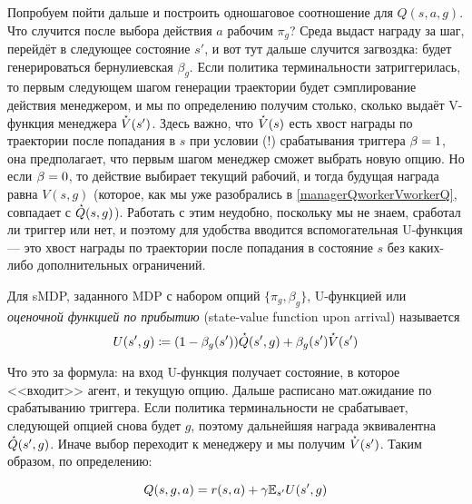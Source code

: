 Попробуем пойти дальше и построить одношаговое соотношение для $Q(s, a, g)$. Что случится после выбора действия $a$ рабочим $\pi_g$? Среда выдаст награду за шаг, перейдёт в следующее состояние $s'$, и вот тут дальше случится загвоздка: будет генерироваться бернулиевская $\beta_g$. Если политика терминальности затриггерилась, то первым следующем шагом генерации траектории будет сэмплирование действия менеджером, и мы по определению получим столько, сколько выдаёт V-функция менеджера $\accentset{\star}{V}(s')$. Здесь важно, что $\accentset{\star}{V}(s)$ есть хвост награды по траектории после попадания в $s$ при условии (!) срабатывания триггера $\beta \HM= 1$, она предполагает, что первым шагом менеджер сможет выбрать новую опцию. Но если $\beta \HM= 0$, то действие выбирает текущий рабочий, и тогда будущая награда равна $V(s, g)$ (которое, как мы уже разобрались в \eqref{managerQworkerVworkerQ}, совпадает с $\accentset{\star}{Q}(s, g)$). Работать с этим неудобно, поскольку мы не знаем, сработал ли триггер или нет, и поэтому для удобства вводится вспомогательная U-функция --- это хвост награды по траектории после попадания в состояние $s$ без каких-либо дополнительных ограничений.

\begin{definition}
Для sMDP, заданного MDP с набором опций $\{\pi_g, \beta_g\}$, U-функцией или \emph{оценочной функцией по прибытию} (state-value function upon arrival) называется
\begin{equation}\label{Ufunction}
U(s', g) \coloneqq (1 - \beta_g(s'))\accentset{\star}{Q}(s', g) + \beta_g(s') \accentset{\star}{V}(s')
\end{equation}
\end{definition}

Что это за формула: на вход U-функция получает состояние, в которое <<входит>> агент, и текущую опцию. Дальше расписано мат.ожидание по срабатыванию триггера. Если политика терминальности не срабатывает, следующей опцией снова будет $g$, поэтому дальнейшяя награда эквивалентна $\accentset{\star}{Q}(s', g)$. Иначе выбор переходит к менеджеру и мы получим $\accentset{\star}{V}(s')$. Таким образом, по определению:

\begin{proposition}
\begin{equation}\label{QU}
Q(s, g, a) = r(s, a) + \gamma \mathbb{E}_{s'} U(s', g)
\end{equation}
\end{proposition}

